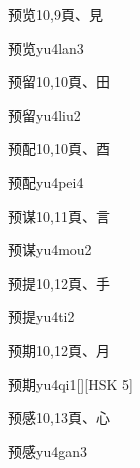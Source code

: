 \begin{Entry}{预览}{10,9}{⾴、⾒}
  \begin{Phonetics}{预览}{yu4lan3}
  \end{Phonetics}
\end{Entry}

\begin{Entry}{预留}{10,10}{⾴、⽥}
  \begin{Phonetics}{预留}{yu4liu2}
  \end{Phonetics}
\end{Entry}

\begin{Entry}{预配}{10,10}{⾴、⾣}
  \begin{Phonetics}{预配}{yu4pei4}
  \end{Phonetics}
\end{Entry}

\begin{Entry}{预谋}{10,11}{⾴、⾔}
  \begin{Phonetics}{预谋}{yu4mou2}
  \end{Phonetics}
\end{Entry}

\begin{Entry}{预提}{10,12}{⾴、⼿}
  \begin{Phonetics}{预提}{yu4ti2}
  \end{Phonetics}
\end{Entry}

\begin{Entry}{预期}{10,12}{⾴、⽉}
  \begin{Phonetics}{预期}{yu4qi1}[][HSK 5]
  \end{Phonetics}
\end{Entry}

\begin{Entry}{预感}{10,13}{⾴、⼼}
  \begin{Phonetics}{预感}{yu4gan3}
  \end{Phonetics}
\end{Entry}


